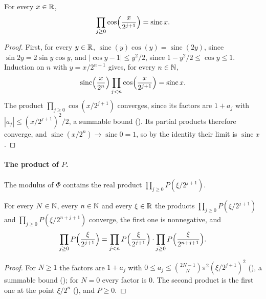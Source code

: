 \begin{proposition}
\label{prop:daub-cos-product}
\leanok
For every $x \in \mathbb{R}$,
\[
  \prod_{j \geq 0} \cos\Bigl(\frac{x}{2^{j+1}}\Bigr) = \operatorname{sinc} x .
\]
\end{proposition}

\begin{proof}
\leanok
{}
First, for every $y \in \mathbb{R}$, $\operatorname{sinc}(y) \cos(y) = \operatorname{sinc}(2y)$, since
$\sin 2y = 2 \sin y \cos y$, and $|\cos y - 1| \leq y^2/2$, since $1 - y^2/2 \leq \cos y \leq 1$.
Induction on $n$ with $y = x/2^{n+1}$ gives, for every $n \in \mathbb{N}$,
\[
  \operatorname{sinc}\Bigl(\frac{x}{2^n}\Bigr) \prod_{j<n} \cos\Bigl(\frac{x}{2^{j+1}}\Bigr)
  = \operatorname{sinc} x .
\]
The product $\prod_{j \geq 0} \cos(x/2^{j+1})$ converges, since its factors are $1 + a_j$ with
$|a_j| \leq (x/2^{j+1})^2/2$, a summable bound (). Its partial products
therefore converge, and $\operatorname{sinc}(x/2^n) \to \operatorname{sinc} 0 = 1$, so by the
identity their limit is $\operatorname{sinc} x$.
\end{proof}

\paragraph{The product of $P$.}
The modulus of $\Phi$ contains the real product $\prod_{j \geq 0} P(\xi/2^{j+1})$.

\begin{lemma}
\label{lem:daub-fun-product}
\leanok
{}
For every $N \in \mathbb{N}$, every $n \in \mathbb{N}$ and every $\xi \in \mathbb{R}$ the products
$\prod_{j \geq 0} P(\xi/2^{j+1})$ and $\prod_{j \geq 0} P(\xi/2^{n+j+1})$ converge, the first
one is nonnegative, and
\[
  \prod_{j \geq 0} P\Bigl(\frac{\xi}{2^{j+1}}\Bigr)
  = \prod_{j<n} P\Bigl(\frac{\xi}{2^{j+1}}\Bigr) \cdot
    \prod_{j \geq 0} P\Bigl(\frac{\xi}{2^{n+j+1}}\Bigr) .
\]
\end{lemma}

\begin{proof}
\leanok
{}
For $N \geq 1$ the factors are $1 + a_j$ with
$0 \leq a_j \leq \binom{2N-1}{N} \pi^2 (\xi/2^{j+1})^2$ (), a
summable bound (); for $N = 0$ every factor is $0$. The second product is
the first one at the point $\xi/2^n$ (), and $P \geq 0$.
\end{proof}


